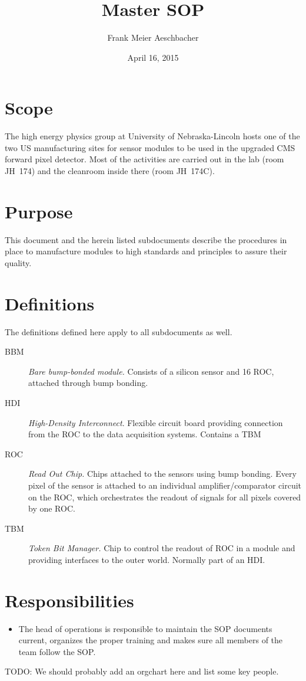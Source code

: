 \documentclass[12pt]{unlsilabsop}
\title{Master SOP}
\date{April 16, 2015}
\author{Frank Meier Aeschbacher}
\begin{document}
\maketitle

\section{Scope}
The high energy physics group at University of Nebraska-Lincoln hosts one of the two US manufacturing sites for sensor modules to be used in the upgraded CMS forward pixel detector. Most of the activities are carried out in the lab (room JH~174) and the cleanroom inside there (room JH~174C).

\section{Purpose}
This document and the herein listed subdocuments describe the procedures in place to manufacture modules to high standards and principles to assure their quality.

\section{Definitions}
The definitions defined here apply to all subdocuments as well.
\begin{description}
    \item[BBM] \emph{Bare bump-bonded module.} Consists of a silicon sensor and 16 ROC, attached through bump bonding.
    \item[HDI] \emph{High-Density Interconnect}. Flexible circuit board providing connection from the ROC to the data acquisition systems. Contains a TBM
    \item[ROC] \emph{Read Out Chip.} Chips attached to the sensors using bump bonding. Every pixel of the sensor is attached to an individual amplifier/comparator circuit on the ROC, which orchestrates the readout of signals for all pixels covered by one ROC.
    \item[TBM] \emph{Token Bit Manager.} Chip to control the readout of ROC in a module and providing interfaces to the outer world. Normally part of an HDI.
\end{description}

\section{Responsibilities}
\begin{itemize}
    \item The head of operations is responsible to maintain the SOP documents current, organizes the proper training and makes sure all members of the team follow the SOP.
\end{itemize}
TODO: We should probably add an orgchart here and list some key people.
\end{document}
